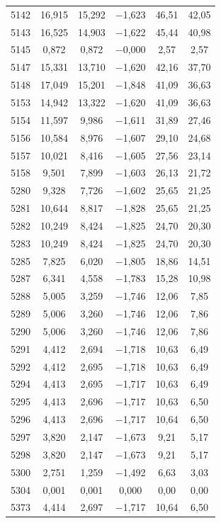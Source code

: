 \begin{longtable}{lccccc}
5142 & 16,915 & 15,292 & $-$1,623 & 46,51 & 42,05 \\
5143 & 16,525 & 14,903 & $-$1,622 & 45,44 & 40,98 \\
5145 & 0,872 & 0,872 & $-$0,000 & 2,57 & 2,57 \\
5147 & 15,331 & 13,710 & $-$1,620 & 42,16 & 37,70 \\
5148 & 17,049 & 15,201 & $-$1,848 & 41,09 & 36,63 \\
5153 & 14,942 & 13,322 & $-$1,620 & 41,09 & 36,63 \\
5154 & 11,597 & 9,986 & $-$1,611 & 31,89 & 27,46 \\
5156 & 10,584 & 8,976 & $-$1,607 & 29,10 & 24,68 \\
5157 & 10,021 & 8,416 & $-$1,605 & 27,56 & 23,14 \\
5158 & 9,501 & 7,899 & $-$1,603 & 26,13 & 21,72 \\
5280 & 9,328 & 7,726 & $-$1,602 & 25,65 & 21,25 \\
5281 & 10,644 & 8,817 & $-$1,828 & 25,65 & 21,25 \\
5282 & 10,249 & 8,424 & $-$1,825 & 24,70 & 20,30 \\
5283 & 10,249 & 8,424 & $-$1,825 & 24,70 & 20,30 \\
5285 & 7,825 & 6,020 & $-$1,805 & 18,86 & 14,51 \\
5287 & 6,341 & 4,558 & $-$1,783 & 15,28 & 10,98 \\
5288 & 5,005 & 3,259 & $-$1,746 & 12,06 & 7,85 \\
5289 & 5,006 & 3,260 & $-$1,746 & 12,06 & 7,86 \\
5290 & 5,006 & 3,260 & $-$1,746 & 12,06 & 7,86 \\
5291 & 4,412 & 2,694 & $-$1,718 & 10,63 & 6,49 \\
5292 & 4,412 & 2,695 & $-$1,718 & 10,63 & 6,49 \\
5294 & 4,413 & 2,695 & $-$1,717 & 10,63 & 6,49 \\
5295 & 4,413 & 2,696 & $-$1,717 & 10,63 & 6,50 \\
5296 & 4,413 & 2,696 & $-$1,717 & 10,64 & 6,50 \\
5297 & 3,820 & 2,147 & $-$1,673 & 9,21 & 5,17 \\
5298 & 3,820 & 2,147 & $-$1,673 & 9,21 & 5,17 \\
5300 & 2,751 & 1,259 & $-$1,492 & 6,63 & 3,03 \\
5304 & 0,001 & 0,001 & 0,000 & 0,00 & 0,00 \\
5373 & 4,414 & 2,697 & $-$1,717 & 10,64 & 6,50 \\

\end{longtable}
